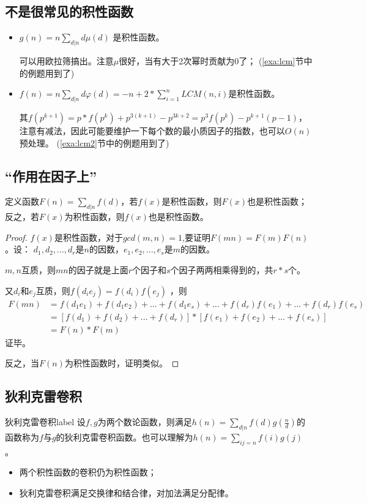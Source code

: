 \subsection{不是很常见的积性函数}
\begin{itemize}
\item $g(n) = n\sum_{d|n}{d\mu(d)}$  是积性函数。

可以用欧拉筛搞出。注意$\mu$很好，当有大于2次幂时贡献为0了；{\color{red} (\ref{exa:lcm}节中的例题用到了)}
\item $f(n)=n\sum_{d|n}d\varphi(d)=-n+2*\sum_{i=1}^nLCM(n,i)$是积性函数。    

其$f(p^{k+1})=p*f(p^k)+p^{3(k+1)}-p^{3k+2}=p^3f(p^{k})-p^{k+1}(p-1)$，注意有减法，因此可能要维护一下每个数的最小质因子的指数，也可以$O(n)$预处理。
{\color{red} (\ref{exa:lcm2}节中的例题用到了)}
\end{itemize}


\subsection{“作用在因子上”}

定义函数$F(n)=\sum_{d|n}f(d)$，若$f(x)$是积性函数，则$F(x)$也是积性函数；反之，若$F(x)$为积性函数，则$f(x)$也是积性函数。

\begin{proof}
$f(x)$是积性函数，对于$gcd(m,n)=1$,要证明$F(mn)=F(m)F(n)$。设：
$d_1,d_2,...,d_r$是$n$的因数，$e_1,e_2,...,e_s$是$m$的因数。

$m,n$互质，则$mn$的因子就是上面$r$个因子和$s$个因子两两相乘得到的，共$r*s$个。

又$d_i$和$e_j$互质，则$f(d_ie_j)=f(d_i)f(e_j)$  ，则
\begin{align*}
F(mn)&=f(d_1e_1)+f(d_1e_2)+...+f(d_1e_s)+...+f(d_r)f(e_1)+...+f(d_r)f(e_s) \\& = [f(d_1)+f(d_2)+...+f(d_r)]*[f(e_1)+f(e_2)+...+f(e_s)] \\ 
&=F(n)*F(m)
\end{align*}
证毕。

反之，当$F(n)$为积性函数时，证明类似。
\end{proof}


\subsection{狄利克雷卷积}
\begin{definition}{狄利克雷卷积}{label}
设$f,g$为两个数论函数，则满足$h(n)=\sum_{d|n}f(d)g(\frac{n}{d})$的函数称为$f$与$g$的狄利克雷卷积函数。也可以理解为$h(n)=\sum_{ij=n}f(i)g(j)$ 。
\begin{itemize}
\item 两个积性函数的卷积仍为积性函数；
\item 狄利克雷卷积满足交换律和结合律，对加法满足分配律。  
\end{itemize}
\end{definition}

